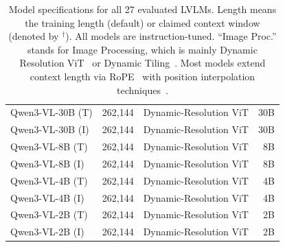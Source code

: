 \documentclass{llmxive}
\begin{document}
\begin{table}[!htbp]
\begin{tabular}{lrcr}
Qwen3-VL-30B (T) & 262,144 & Dynamic-Resolution ViT & 30B \\
Qwen3-VL-30B (I) & 262,144 & Dynamic-Resolution ViT & 30B \\
Qwen3-VL-8B (T) & 262,144 & Dynamic-Resolution ViT & 8B \\
Qwen3-VL-8B (I) & 262,144 & Dynamic-Resolution ViT & 8B \\
Qwen3-VL-4B (T) & 262,144 & Dynamic-Resolution ViT & 4B \\
Qwen3-VL-4B (I) & 262,144 & Dynamic-Resolution ViT & 4B \\
Qwen3-VL-2B (T) & 262,144 & Dynamic-Resolution ViT & 2B \\
Qwen3-VL-2B (I) & 262,144 & Dynamic-Resolution ViT & 2B \\
\bottomrule
\end{tabular}
\caption{
        Model specifications for all 27 evaluated LVLMs. Length means the training length (default) or claimed context window (denoted by $^\dagger$). All models are instruction-tuned. ``Image Proc.'' stands for Image Processing, which is mainly Dynamic Resolution ViT~\citep{wang2024qwen2} or Dynamic Tiling~\citep{wu2024deepseek}. Most models extend context length via RoPE~\citep{su2024roformer} with position interpolation techniques~\citep{chen2023extending,ding2024longrope,pengyarn}.
    }
\label{tab:new_model_list}
\end{table}
\end{document}
